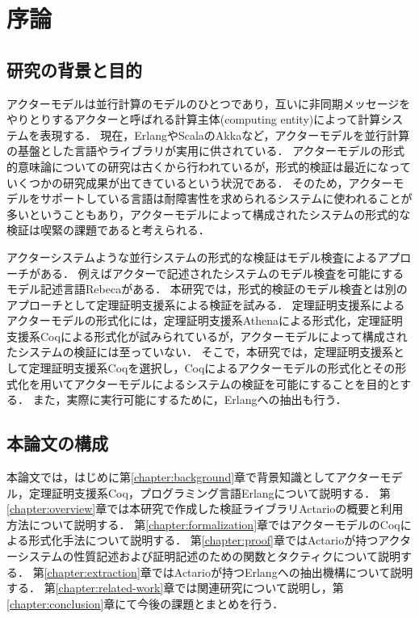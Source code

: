 \chapter{序論}
\label{chapter:intro}

\section{研究の背景と目的}
アクターモデル\cite{Agha:1986aa}は並行計算のモデルのひとつであり，互いに非同期メッセージをやりとりするアクターと呼ばれる計算主体(computing entity)によって計算システムを表現する．
現在，Erlang\cite{Erlang}やScala\cite{Scala}のAkka\cite{Akka}など，アクターモデルを並行計算の基盤とした言語やライブラリが実用に供されている．
アクターモデルの形式的意味論についての研究は古くから行われているが，形式的検証は最近になっていくつかの研究成果が出てきているという状況である．
そのため，アクターモデルをサポートしている言語は耐障害性を求められるシステムに使われることが多いということもあり，アクターモデルによって構成されたシステムの形式的な検証は喫緊の課題であると考えられる．

アクターシステムような並行システムの形式的な検証はモデル検査によるアプローチがある．
例えばアクターで記述されたシステムのモデル検査を可能にするモデル記述言語Rebeca\cite{Sirjani:2011aa}がある．
本研究では，形式的検証のモデル検査とは別のアプローチとして定理証明支援系による検証を試みる．
定理証明支援系によるアクターモデルの形式化には，定理証明支援系Athenaによる形式化\cite{Musser:2013aa}，定理証明支援系Coqによる形式化\cite{Garnock-Jones:2014aa}が試みられているが，アクターモデルによって構成されたシステムの検証には至っていない．
そこで，本研究では，定理証明支援系として定理証明支援系Coqを選択し，Coqによるアクターモデルの形式化とその形式化を用いてアクターモデルによるシステムの検証を可能にすることを目的とする．
また，実際に実行可能にするために，Erlangへの抽出も行う．


\section{本論文の構成}
本論文では，はじめに第\ref{chapter:background}章で背景知識としてアクターモデル，定理証明支援系Coq，プログラミング言語Erlangについて説明する．
第\ref{chapter:overview}章では本研究で作成した検証ライブラリActarioの概要と利用方法について説明する．
第\ref{chapter:formalization}章ではアクターモデルのCoqによる形式化手法について説明する．
第\ref{chapter:proof}章ではActarioが持つアクターシステムの性質記述および証明記述のための関数とタクティクについて説明する．
第\ref{chapter:extraction}章ではActarioが持つErlangへの抽出機構について説明する．
第\ref{chapter:related-work}章では関連研究について説明し，第\ref{chapter:conclusion}章にて今後の課題とまとめを行う．

